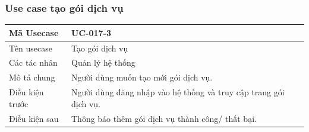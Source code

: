 \documentclass[12pt,a4paper]{article}
\begin{document}
    \subsubsection*{Use case tạo gói dịch vụ}
    \begin{table}[H]
        \centering
        \begin{tabular}{|p{3.5cm}|p{11.5cm}|c|}
            \hline
            Mã Usecase      & UC-017-3                                                         \\
            \hline
            Tên usecase     & Tạo gói dịch vụ                                                  \\
            \hline
            Các tác nhân    & Quản lý hệ thống                                                 \\
            \hline
            Mô tả chung     & Người dùng muốn tạo mới gói dịch vụ.                             \\
            \hline

            Điều kiện trước & Người dùng đăng nhập vào hệ thống và truy cập trang gói dịch vụ. \\
            \hline

            Điều kiện sau   & Thông báo thêm gói dịch vụ thành công/ thất bại.                 \\
            \hline


\end{tabular}
\end{table}
\end{document}
